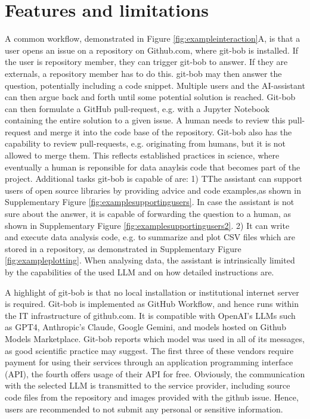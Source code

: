\documentclass{ecai}
\begin{document}

\section{Features and limitations}

A common workflow, demonstrated in Figure \ref{fig:exampleinteraction}A, is that a user opens an issue on a repository on Github.com, where git-bob is installed. If the user is repository member, they can trigger git-bob to answer. If they are externals, a repository member has to do this. git-bob may then answer the question, potentially including a code snippet. Multiple users and the AI-assistant can then argue back and forth until some potential solution is reached. Git-bob can then formulate a GitHub pull-request, e.g. with a Jupyter Notebook containing the entire solution to a given issue. A human needs to review this pull-request and merge it into the code base of the repository. Git-bob also has the capability to review pull-requests, e.g. originating from humans, but it is not allowed to merge them. This reflects established practices in science, where eventually a human is reponsible for data anaylsis code that becomes part of the project. Additional tasks git-bob is capable of are: 1) TThe assistant can support users of open source libraries by providing advice and code examples,as shown in Supplementary Figure \ref{fig:examplesupportingusers}. In case the assistant is not sure about the answer, it is capable of forwarding the question to a human, as shown in Supplementary Figure \ref{fig:examplesupportingusers2}. 2) It can write and execute data analysis code, e.g. to summarize and plot CSV files which are stored in a repository, as demonstrated in Supplementary Figure \ref{fig:exampleplotting}. When analysing data, the assistant is intrinsically limited by the capabilities of the used LLM and on how detailed instructions are.

A highlight of git-bob is that no local installation or institutional internet server is required. Git-bob is implemented as GitHub Workflow, and hence runs within the IT infrastructure of github.com. It is compatible with OpenAI's LLMs such as GPT4, Anthropic's Claude, Google Gemini, and models hosted on Github Models Marketplace. Git-bob reports which model was used in all of its messages, as good scientific practice may suggest. The first three of these vendors require payment for using their services through an application programming interface (API), the fourth offers usage of their API for free. Obviously, the communication with the selected LLM is transmitted to the service provider, including source code files from the repository and images provided with the github issue. Hence, users are recommended to not submit any personal or sensitive information. 
\end{document}
